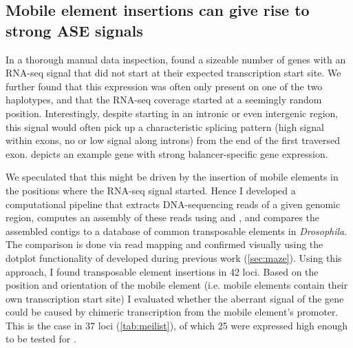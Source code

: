 \subsection{Mobile element insertions can give rise to strong ASE signals}
\label{sec:balancer_ase_mei}


In a thorough manual data inspection, \yad found a sizeable number of genes with
an RNA-seq signal that did not start at their expected transcription start site.
We further found that this expression was often only present on one of the two
haplotypes, and that the RNA-seq coverage started at a seemingly random
position. Interestingly, despite starting in an intronic or even intergenic
region, this signal would often pick up a characteristic splicing pattern
(high signal within exons, no or low signal along introns) from the end of the
first traversed exon.  depicts an example gene
with strong balancer-specific gene expression.

We speculated that this might be driven by the insertion of mobile elements in
the positions where the RNA-seq signal started. Hence I developed a computational
pipeline that extracts DNA-sequencing reads of a given genomic region,
computes an assembly of these reads using \samtools and \spades, and compares the assembled
contigs to a database of common transposable elements in \textit{Drosophila}.
The comparison is done via read mapping and confirmed visually using the dotplot
functionality of \maze developed during previous work (\cref{sec:maze}). Using this
approach, I found transposable element insertions in 42 loci. Based on the
position and orientation of the mobile element (i.e. mobile elements contain
their own transcription start site) I evaluated whether the aberrant \ase
signal of the gene could be caused by chimeric transcription from the mobile
element’s promoter. This is the case in 37 loci (\cref{tab:meilist}),
of which 25 were expressed high enough to be tested for \ase.

